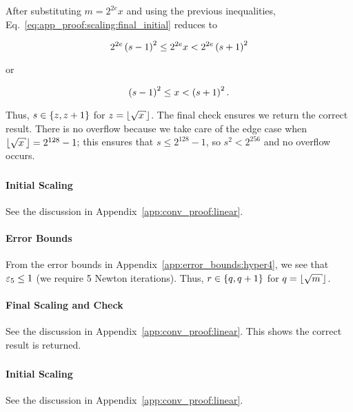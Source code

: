 \noindent
After substituting $m=2^{2e}x$ and using the previous inequalities,
Eq.~\eqref{eq:app_proof:scaling:final_initial} reduces to

\begin{equation}
    2^{2e}\left( s-1 \right)^{2} \le 2^{2e}x < 2^{2e}\left( s+1 \right)^{2}
\end{equation}

\noindent
or

\begin{equation}
    \left( s-1 \right)^{2} \le x < \left( s+1 \right)^{2}.
\end{equation}

\noindent
Thus, $s\in\left\{ z, z+1 \right\}$ for $z=\floor{\sqrt{x}}$.
The final check ensures we return the correct result.
There is no overflow because we take care of the edge case
when $\floor{\sqrt{x}} = 2^{128} - 1$;
this ensures that $s\le 2^{128} - 1$, so $s^{2} < 2^{256}$
and no overflow occurs.

\subsubsection{\HyperFour{}}
\label{app:conv_proof:hyper4}

\paragraph{Initial Scaling}
See the discussion in Appendix~\ref{app:conv_proof:linear}.

\paragraph{Error Bounds}
From the error bounds in Appendix~\ref{app:error_bounds:hyper4},
we see that $\varepsilon_{5}\le1$ (we require 5 Newton iterations).
Thus, $r\in\left\{ q,q+1 \right\}$ for $q = \floor{\sqrt{m}}$.

\paragraph{Final Scaling and Check}
See the discussion in Appendix~\ref{app:conv_proof:linear}.
This shows the correct result is returned.

\subsubsection{\LookupFour{}}
\label{app:conv_proof:lookup4}

\paragraph{Initial Scaling}
See the discussion in Appendix~\ref{app:conv_proof:linear}.

